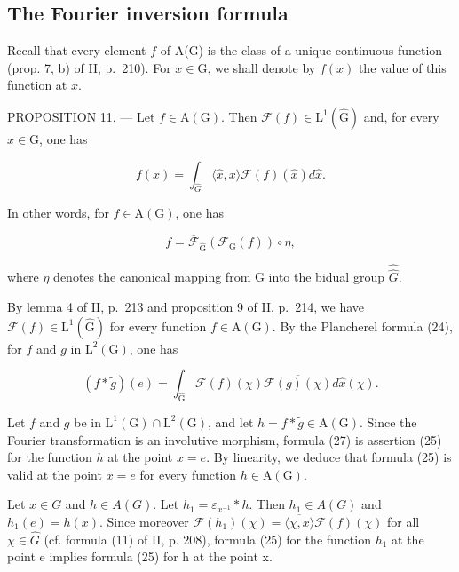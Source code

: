 \subsection{The Fourier inversion formula}

Recall that every element \(f\) of A(G) is the class of a unique continuous function (prop. 7, b) of II, p.~210). For \(x \in \mathrm{G}\), we shall denote by \(f(x)\) the value of this function at \(x\).

PROPOSITION 11. --- Let \(f \in \mathrm{A}(\mathrm{G})\). Then \(\mathcal{F}(f) \in \mathrm{L}^1(\widehat{\mathrm{G}})\) and, for every \(x \in \mathrm{G}\), one has

\[
f (x) = \int_ {\widehat {G}} \langle \widehat {x}, x \rangle \mathcal {F} (f) (\widehat {x}) d \widehat {x}.\tag{25}
\]

In other words, for \(f \in \mathrm{A}(\mathrm{G})\), one has

\[
f = \overline {{\mathcal {F}}} _ {\widehat {\mathrm{G}}} (\mathcal {F} _ {\mathrm{G}} (f)) \circ \eta ,\tag{26}
\]

where \(\eta\) denotes the canonical mapping from G into the bidual group \(\widehat{\widehat{G}}\).

By lemma 4 of II, p.~213 and proposition 9 of II, p.~214, we have \(\mathcal{F}(f) \in \mathrm{L}^1(\widehat{\mathrm{G}})\) for every function \(f \in \mathrm{A}(\mathrm{G})\). By the Plancherel formula (24), for \(f\) and \(g\) in \(\mathrm{L}^2(\mathrm{G})\), one has

\[
(f * \widetilde {g}) (e) = \int_ {\widehat {\mathrm{G}}} \mathcal {F} (f) (\chi) \overline {{\mathcal {F} (g) (\chi)}} d \widehat {x} (\chi).\tag{27}
\]

Let \(f\) and \(g\) be in \(\mathrm{L}^1(\mathrm{G}) \cap \mathrm{L}^2(\mathrm{G})\), and let \(h = f * \widetilde{g} \in \mathrm{A}(\mathrm{G})\). Since the Fourier transformation is an involutive morphism, formula (27) is assertion (25) for the function \(h\) at the point \(x = e\). By linearity, we deduce that formula (25) is valid at the point \(x = e\) for every function \(h \in \mathrm{A}(\mathrm{G})\).

Let \(x \in G\) and \(h \in A(G)\). Let \(h_{1} = \varepsilon_{x^{-1}} * h\). Then \(h_{1} \in A(G)\) and \(h_{1}(e) = h(x)\). Since moreover \(\mathcal{F}(h_{1})(\chi) = \overline{\langle\chi, x\rangle}\mathcal{F}(f)(\chi)\) for all \(\chi \in \widehat{G}\) (cf. formula (11) of II, p. 208), formula (25) for the function \(h_{1}\) at the point e implies formula (25) for h at the point x.

